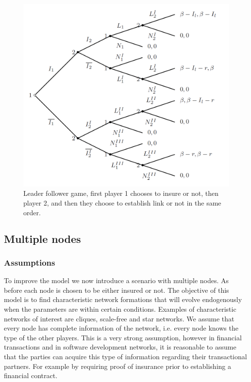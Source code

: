 \begin{figure}[h]
\centering
  \includegraphics[width=0.9\linewidth]{../Figures/stackelberggame.png}
  \caption{\label{fig:stackelberg} Leader follower game, first player 1 chooses to insure or not, then player 2, and then they choose to establish link or not in the same order.}
\end{figure}


\subsection{Multiple nodes}
\subsubsection{Assumptions}
To improve the model we now introduce a scenario with multiple nodes. As before each node is chosen to be either insured or not. The objective of this model is to find characteristic network formations that will evolve endogenously when the parameters are within certain conditions. Examples of characteristic networks of interest are cliques, scale-free and star networks.
We assume that every node has complete information of the network, i.e. every node knows the type of the other players. This is a very strong assumption, however in financial transactions and in software development networks, it is reasonable to assume that the parties can acquire this type of information regarding their transactional partners. For example by requiring proof of insurance prior to establishing a financial contract.

